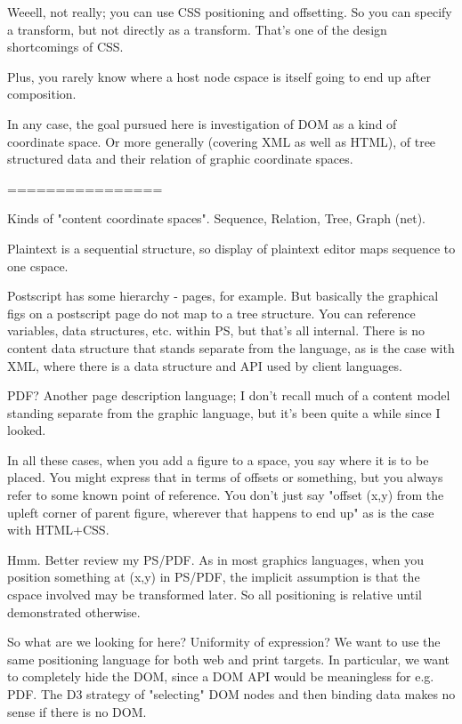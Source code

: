 \documentclass[12pt]{tufte-handout}
\numberwithin{equation}{subsection}
\numberwithin{equation}{subsection}
\begin{document}
  Weeell, not really; you can use CSS positioning and offsetting.  So
  you can specify a transform, but not directly as a transform.  That's
  one of the design shortcomings of CSS.

  Plus, you rarely know where a host node cspace is itself going to end
  up after composition.

  In any case, the goal pursued here is investigation of DOM as a kind
  of coordinate space.  Or more generally (covering XML as well as
  HTML), of tree structured data and their relation of graphic
  coordinate spaces.


  ================

  Kinds of "content coordinate spaces".  Sequence, Relation, Tree, Graph
  (net).

  Plaintext is a sequential structure, so display of plaintext editor
  maps sequence to one cspace.

  Postscript has some hierarchy - pages, for example.  But basically the
  graphical figs on a postscript page do not map to a tree structure.
  You can reference variables, data structures, etc. within PS, but
  that's all internal.  There is no content data structure that stands
  separate from the language, as is the case with XML, where there is a
  data structure and API used by client languages.

  PDF?  Another page description language; I don't recall much of a
  content model standing separate from the graphic language, but it's
  been quite a while since I looked.

  In all these cases, when you add a figure to a space, you say where it
  is to be placed.  You might express that in terms of offsets or
  something, but you always refer to some known point of reference.  You
  don't just say "offset (x,y) from the upleft corner of parent
  figure, wherever that happens to end up" as is the case with HTML+CSS.

  Hmm.  Better review my PS/PDF.  As in most graphics languages, when
  you position something at (x,y) in PS/PDF, the implicit assumption is
  that the cspace involved may be transformed later.  So all positioning
  is relative until demonstrated otherwise.

  So what are we looking for here?  Uniformity of expression?  We want
  to use the same positioning language for both web and print targets.
  In particular, we want to completely hide the DOM, since a DOM API
  would be meaningless for e.g. PDF.  The D3 strategy of "selecting" DOM
  nodes and then binding data makes no sense if there is no DOM.
\end{document}
